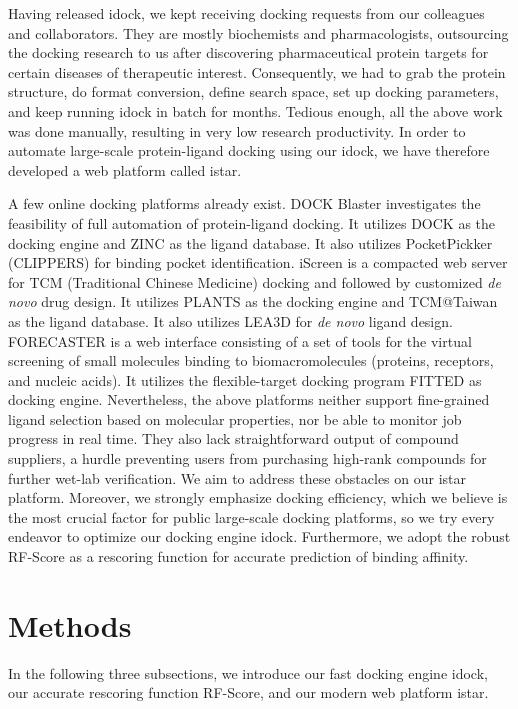 \documentclass[10pt]{article}
\begin{document}
Having released idock, we kept receiving docking requests from our colleagues and collaborators. They are mostly biochemists and pharmacologists, outsourcing the docking research to us after discovering pharmaceutical protein targets for certain diseases of therapeutic interest. Consequently, we had to grab the protein structure, do format conversion, define search space, set up docking parameters, and keep running idock in batch for months. Tedious enough, all the above work was done manually, resulting in very low research productivity. In order to automate large-scale protein-ligand docking using our idock, we have therefore developed a web platform called istar.

A few online docking platforms already exist. DOCK Blaster \cite{557} investigates the feasibility of full automation of protein-ligand docking. It utilizes DOCK \cite{1222} as the docking engine and ZINC \cite{532,1178} as the ligand database. It also utilizes PocketPickker (CLIPPERS) \cite{395} for binding pocket identification. iScreen \cite{899} is a compacted web server for TCM (Traditional Chinese Medicine) docking and followed by customized \textit{de novo} drug design. It utilizes PLANTS \cite{610,607,779} as the docking engine and TCM@Taiwan \cite{528} as the ligand database. It also utilizes LEA3D \cite{1223} for \textit{de novo} ligand design. FORECASTER \cite{1012} is a web interface consisting of a set of tools for the virtual screening of small molecules binding to biomacromolecules (proteins, receptors, and nucleic acids). It utilizes the flexible-target docking program FITTED \cite{602} as docking engine. Nevertheless, the above platforms neither support fine-grained ligand selection based on molecular properties, nor be able to monitor job progress in real time. They also lack straightforward output of compound suppliers, a hurdle preventing users from purchasing high-rank compounds for further wet-lab verification. We aim to address these obstacles on our istar platform. Moreover, we strongly emphasize docking efficiency, which we believe is the most crucial factor for public large-scale docking platforms, so we try every endeavor to optimize our docking engine idock. Furthermore, we adopt the robust RF-Score \cite{564} as a rescoring function for accurate prediction of binding affinity.

\section*{Methods}
In the following three subsections, we introduce our fast docking engine idock, our accurate rescoring function RF-Score, and our modern web platform istar.
\end{document}

